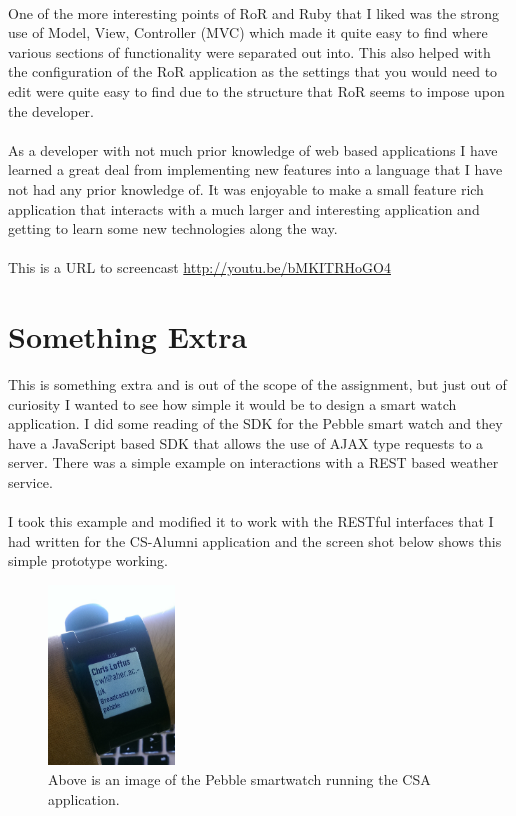 \documentclass{article}
\begin{document}
\\
One of the more interesting points of RoR and Ruby that I liked was the strong use of Model, View, Controller (MVC) which made it quite easy to find where various sections of functionality were separated out into. This also helped with the configuration of the RoR application as the settings that you would need to edit were quite easy to find due to the structure that RoR seems to impose upon the developer.\\
\\
As a developer with not much prior knowledge of web based applications I have learned a great deal from implementing new features into a language that I have not had any prior knowledge of. It was enjoyable to make a small feature rich application that interacts with a much larger and interesting application and getting to learn some new technologies along the way.\\
\\
This is a URL to screencast \url{http://youtu.be/bMKITRHoGO4}

\newpage
\section{Something Extra}

This is something extra and is out of the scope of the assignment, but just out of curiosity I wanted to see how simple it would be to design a smart watch application. I did some reading of the SDK for the Pebble smart watch and they have a JavaScript based SDK that allows the use of AJAX type requests to a server. There was a simple example on interactions with a REST based weather service.\\
\\
I took this example and modified it to work with the RESTful interfaces that I had written for the CS-Alumni application and the screen shot below shows this simple prototype working.

\begin{figure}[H]
\centering
\includegraphics[width=0.3\textwidth]{pebble}
\caption{Above is an image of the Pebble smartwatch running the CSA application.}
\end{figure}
\end{document}
